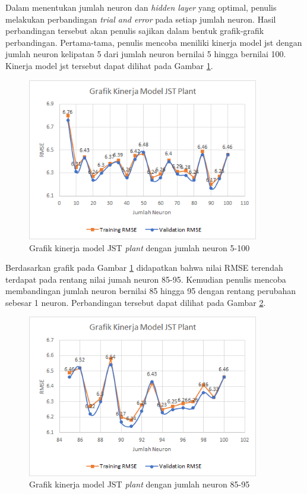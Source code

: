 Dalam menentukan jumlah neuron dan \textit{hidden layer} yang optimal, penulis melakukan perbandingan \textit{trial and error} pada setiap jumlah neuron. Hasil perbandingan tersebut akan penulis sajikan dalam bentuk grafik-grafik perbandingan. Pertama-tama, penulis mencoba meniliki kinerja model jst dengan jumlah neuron kelipatan 5 dari jumlah neuron bernilai 5 hingga bernilai 100. Kinerja model jst tersebut dapat dilihat pada Gambar \ref{fig:5:Neuron5-100}.
\begin{figure}[!h]
	\centering
	\includegraphics[width=0.9\textwidth]{figures/Neuron5-100}
	\caption{Grafik kinerja model JST \textit{plant} dengan jumlah neuron 5-100}
	\label{fig:5:Neuron5-100}
\end{figure}

Berdasarkan grafik pada Gambar \ref{fig:5:Neuron5-100} didapatkan bahwa nilai RMSE terendah terdapat pada rentang nilai jumah neuron 85-95. Kemudian penulis mencoba membandingan jumlah neuron bernilai 85 hingga 95 dengan rentang perubahan sebesar 1 neuron. Perbandingan tersebut dapat dilihat pada Gambar \ref{fig:5:Neuron85-95}.
\begin{figure}[!h]
	\centering
	\includegraphics[width=0.9\textwidth]{figures/Neuron85-95}
	\caption{Grafik kinerja model JST \textit{plant} dengan jumlah neuron 85-95}
	\label{fig:5:Neuron85-95}
\end{figure}

